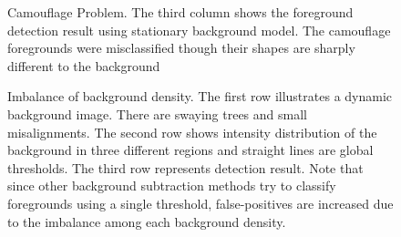 \documentclass[a4paper,twocolumn, 10pt]{article}
\begin{document}
\begin{figure}[t]
  \centering
  \label{fig10}
  \hfill
  \hfill
  \caption{Camouflage Problem. The third column shows the foreground detection result using stationary background model. The camouflage foregrounds were misclassified though their shapes are sharply different to the background}
\end{figure}

\begin{figure}[t]
  \centering
  \label{fig20}
  \hfill
  \caption{Imbalance of background density. The first row illustrates a dynamic background image. There are swaying trees and small misalignments. The second row shows intensity distribution of the background in three different regions and straight lines are global thresholds. The third row represents detection result. Note that since other background subtraction methods try to classify foregrounds using a single threshold, false-positives are increased due to the imbalance among each background density.}
\end{figure}
\end{document}

